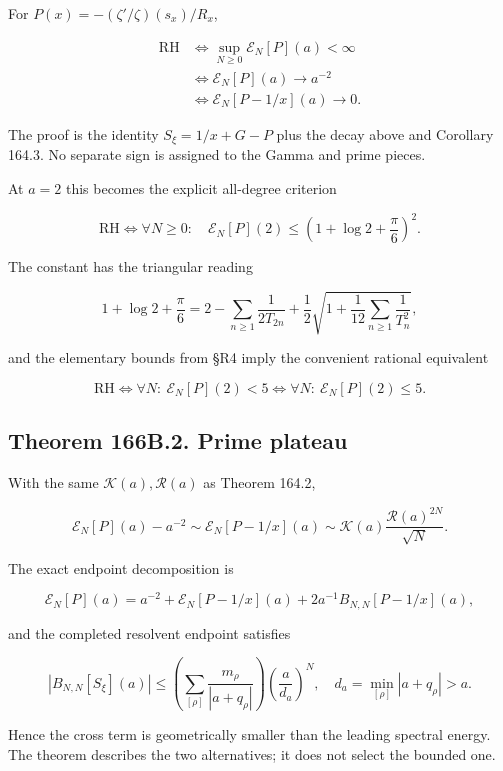 \documentclass[
  11pt,
]{book}
\begin{document}
For \(P(x)=-(\zeta'/\zeta)(s_x)/R_x\),

\[
\boxed{\begin{aligned}
\mathrm{RH}&\iff\sup_{N\ge0}\mathscr E_N[P](a)<\infty\\
&\iff\mathscr E_N[P](a)\longrightarrow a^{-2}\\
&\iff\mathscr E_N[P-1/x](a)\longrightarrow0.
\end{aligned}}
\tag{166B.9}
\]

The proof is the identity \(S_\xi=1/x+G-P\) plus the decay above and
Corollary 164.3. No separate sign is assigned to the Gamma and prime
pieces.

At \(a=2\) this becomes the explicit all-degree criterion

\[
\boxed{\mathrm{RH}\iff
\forall N\ge0:\quad
\mathscr E_N[P](2)\le\left(1+\log2+\frac\pi6\right)^2.}
\tag{166B.11}
\]

The constant has the triangular reading

\[
1+\log2+\frac\pi6
=2-\sum_{n\ge1}\frac1{2T_{2n}}
+\frac12\sqrt{1+\frac1{12}\sum_{n\ge1}\frac1{T_n^2}},
\tag{166B.12}
\]

and the elementary bounds from §R4 imply the convenient rational
equivalent

\[
\boxed{\mathrm{RH}\iff
\forall N:\ \mathscr E_N[P](2)<5
\iff\forall N:\ \mathscr E_N[P](2)\le5.}
\tag{166B.12a}
\]

\subsection{Theorem 166B.2. Prime
plateau}\label{theorem-166b.2.-prime-plateau}

With the same \(\mathcal K(a),\mathcal R(a)\) as Theorem 164.2,

\[
\boxed{\mathscr E_N[P](a)-a^{-2}
\sim\mathscr E_N[P-1/x](a)
\sim\mathcal K(a)\frac{\mathcal R(a)^{2N}}{\sqrt N}.}
\tag{166B.13}
\]

The exact endpoint decomposition is

\[
\mathscr E_N[P](a)=a^{-2}+\mathscr E_N[P-1/x](a)
+2a^{-1}B_{N,N}[P-1/x](a),
\tag{166B.16}
\]

and the completed resolvent endpoint satisfies

\[
|B_{N,N}[S_\xi](a)|\le
\left(\sum_{[\rho]}\frac{m_\rho}{|a+q_\rho|}\right)
\left(\frac a{d_a}\right)^N,
\quad d_a=\min_{[\rho]}|a+q_\rho|>a.
\tag{166B.17}
\]

Hence the cross term is geometrically smaller than the leading spectral
energy. The theorem describes the two alternatives; it does not select
the bounded one.
\end{document}
